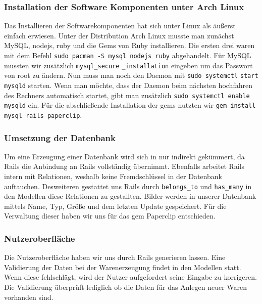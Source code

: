 \subsubsection{Installation der Software Komponenten unter Arch Linux}
Das Installieren der Softwarekomponenten hat sich unter Linux als \"au{\ss}erst einfach erwiesen. Unter der Distribution Arch Linux musste man zun\"achst MySQL, nodejs, ruby und die Gems von Ruby installieren. Die ersten drei waren mit dem Befehl \texttt{sudo pacman -S mysql nodejs ruby} abgehandelt. F\"ur MySQL mussten wir  zus\"atzlich \texttt{mysql\_secure} \texttt{\_installation} eingeben um das Passwort von root zu \"andern. Nun muss man noch den Daemon mit \texttt{sudo systemctl} \texttt{start mysqld} starten. Wenn man m\"ochte, dass der Daemon beim n\"achsten hochfahren des Rechners automatisch startet, gibt man zus\"atzlich \texttt{sudo systemctl enable mysqld} ein. F\"ur die abschlie{\ss}ende Installation der gems nutzten wir \texttt{gem install mysql rails paperclip}. 

\subsubsection{Umsetzung der Datenbank}
Um eine Erzeugung einer Datenbank wird sich in nur indirekt gek\"ummert, da Rails die Anbindung an Rails vollst\"andig \"ubernimmt. Ebenfalls arbeitet Rails intern mit Relationen, weshalb keine Fremdschl\"ussel in der Datenbank auftauchen. Desweiteren gestattet uns Rails durch \texttt{belongs\_to} und \texttt{has\_many} in den Modellen diese Relationen zu gestallten. Bilder werden in unserer Datenbank mittels Name, Typ, Gr\"o{\ss}e und dem letzten Update gespeichert. F\"ur die Verwaltung dieser haben wir uns f\"ur das gem Paperclip entschieden. 

\subsubsection{Nutzeroberfl\"ache}
Die Nutzeroberfl\"ache haben wir uns durch Rails generieren lassen. Eine Validierung der Daten bei der Warenerzeugung findet in den Modellen statt. Wenn diese fehlschl\"agt, wird der Nutzer aufgefordert seine Eingabe zu korrigeren. Die Validierung \"uberpr\"uft lediglich ob die Daten f\"ur das Anlegen neuer Waren vorhanden sind.  
